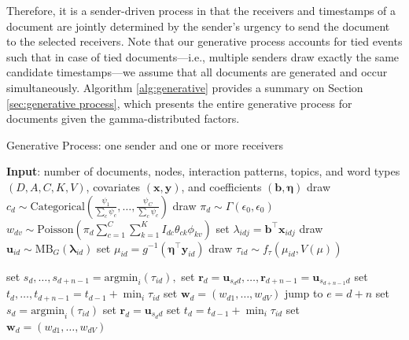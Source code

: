 \documentclass[ba]{imsart}
\def\spacingset#1{\renewcommand{\baselinestretch}%
	{#1}\small\normalsize} \spacingset{1}
\numberwithin{equation}{section}
\theoremstyle{plain}
\begin{document}
		Therefore, it is a sender-driven process in that the receivers and timestamps of a document are jointly determined by the sender's urgency to send the document to the selected receivers. Note that our generative process accounts for tied events such that in case of tied documents---i.e., multiple senders draw exactly the same candidate timestamps---we assume that all documents are generated and occur simultaneously. Algorithm \ref{alg:generative} provides a summary on Section \ref{sec:generative process}, which presents the entire generative process for documents given the gamma-distributed factors.
	\begin{algorithm}[!t]
		\spacingset{1}
		\SetAlgoLined
		\caption{Generative Process: one sender and one or more receivers}
	\begin{algorithmic}
		\STATE \textbf{Input}: number of documents, nodes, interaction patterns, topics, and word types $(D, A, C, K, V)$, covariates $(\boldsymbol{x}, \boldsymbol{y})$, and coefficients $(\boldsymbol{b}, \boldsymbol{\eta})$
		\vskip 0.1in
		\STATE	draw $c_d\sim \mbox{Categorical}(\frac{\psi_1}{\sum_c \psi_c},\ldots,\frac{\psi_C}{\sum_c\psi_c})$
		\STATE draw $\pi_{d}\sim \Gamma(\epsilon_0,\epsilon_0)$
		\STATE $w_{dv} \sim \mbox{Poisson}(\pi_{d}\sum_{c=1}^C \sum_{k=1}^K I_{dc} \theta_{ck}\phi_{kv})$
			\ENDFOR
		\STATE	set $\lambda_{idj} = {\boldsymbol{b}}^{\top}\boldsymbol{x}_{idj}$
		\ENDFOR
		\STATE	draw $\boldsymbol{u}_{id}  \sim
		\mbox{MB}_G(\boldsymbol{\lambda}_{id})$
		\STATE		set $\mu_{id} = g^{-1}(\boldsymbol{\eta}^\top \boldsymbol{y}_{id})$
		\STATE		draw $\tau_{id} \sim f_\tau(\mu_{id}, V(\mu))$
		\ENDFOR
		
		\STATE	set $s_d,\ldots, s_{d+n-1}=\mbox{argmin}_{i}(\tau_{id}),$
		\STATE	set $\boldsymbol{r}_d=\boldsymbol{u}_{s_d d},\ldots,\boldsymbol{r}_{d+n-1}=\boldsymbol{u}_{s_{d+n-1} d}$
		\STATE	set $t_d, \ldots, t_{d+n-1}=t_{d-1} + \min_i\tau_{id}$
		\STATE set $\boldsymbol{w}_d=(w_{d1},\ldots,w_{dV})$
		\STATE		jump to $e = d+n$
		\ELSE
		\STATE	set $s_d= \mbox{argmin}_{i}(\tau_{id})$
		\STATE		set $\boldsymbol{r}_d= \boldsymbol{u}_{s_d d}$
		\STATE	set $t_d =t_{d-1} + \min_i\tau_{id}$
			\STATE set $\boldsymbol{w}_d=(w_{d1},\ldots,w_{dV})$
		\ENDIF
		\ENDFOR
	\end{algorithmic}
		\label{alg:generative}
	\end{algorithm}
	\newpage
\end{document}

